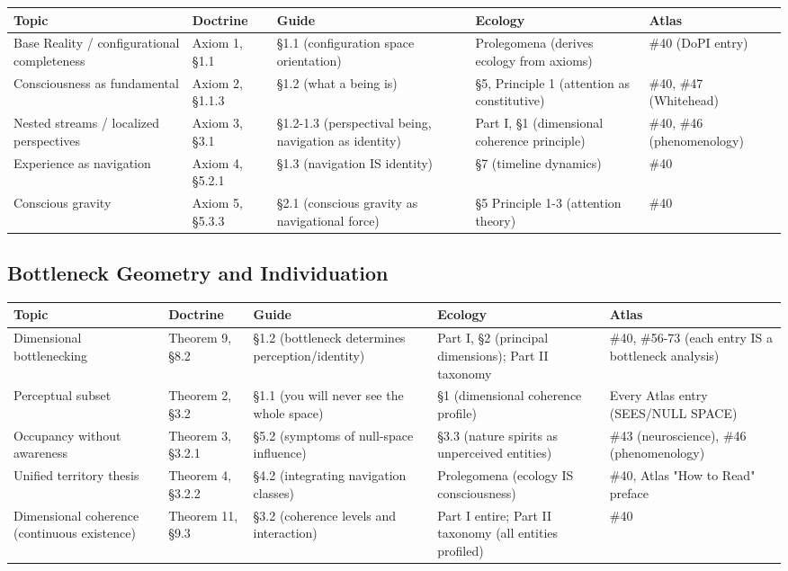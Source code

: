 \begin{longtable}{p{} p{} p{} p{} p{}}
\toprule
\textbf{Topic} & \textbf{Doctrine} & \textbf{Guide} & \textbf{Ecology} & \textbf{Atlas} \\
\midrule
\endhead
Base Reality / configurational completeness & Axiom 1, §1.1 & §1.1 (configuration space orientation) & Prolegomena (derives ecology from axioms) & \#40 (DoPI entry) \\
Consciousness as fundamental & Axiom 2, §1.1.3 & §1.2 (what a being is) & §5, Principle 1 (attention as constitutive) & \#40, \#47 (Whitehead) \\
Nested streams / localized perspectives & Axiom 3, §3.1 & §1.2-1.3 (perspectival being, navigation as identity) & Part I, §1 (dimensional coherence principle) & \#40, \#46 (phenomenology) \\
Experience as navigation & Axiom 4, §5.2.1 & §1.3 (navigation IS identity) & §7 (timeline dynamics) & \#40 \\
Conscious gravity & Axiom 5, §5.3.3 & §2.1 (conscious gravity as navigational force) & §5 Principle 1-3 (attention theory) & \#40 \\
\bottomrule
\end{longtable}



\subsection*{Bottleneck Geometry and Individuation}



\begin{longtable}{p{} p{} p{} p{} p{}}
\toprule
\textbf{Topic} & \textbf{Doctrine} & \textbf{Guide} & \textbf{Ecology} & \textbf{Atlas} \\
\midrule
\endhead
Dimensional bottlenecking & Theorem 9, §8.2 & §1.2 (bottleneck determines perception/identity) & Part I, §2 (principal dimensions); Part II taxonomy & \#40, \#56-73 (each entry IS a bottleneck analysis) \\
Perceptual subset & Theorem 2, §3.2 & §1.1 (you will never see the whole space) & §1 (dimensional coherence profile) & Every Atlas entry (SEES/NULL SPACE) \\
Occupancy without awareness & Theorem 3, §3.2.1 & §5.2 (symptoms of null-space influence) & §3.3 (nature spirits as unperceived entities) & \#43 (neuroscience), \#46 (phenomenology) \\
Unified territory thesis & Theorem 4, §3.2.2 & §4.2 (integrating navigation classes) & Prolegomena (ecology IS consciousness) & \#40, Atlas "How to Read" preface \\
Dimensional coherence (continuous existence) & Theorem 11, §9.3 & §3.2 (coherence levels and interaction) & Part I entire; Part II taxonomy (all entities profiled) & \#40 \\
\bottomrule
\end{longtable}



